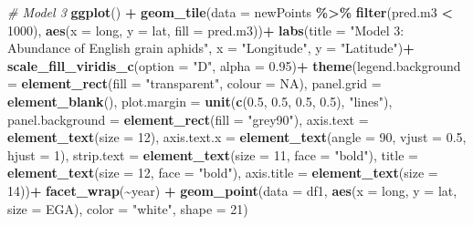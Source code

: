 \documentclass[
]{book}
\newenvironment{Shaded}{\begin{snugshade}}{\end{snugshade}}
\newcommand{\AttributeTok}[1]{\textcolor[rgb]{0.13,0.29,0.53}{#1}}
\newcommand{\CommentTok}[1]{\textcolor[rgb]{0.56,0.35,0.01}{\textit{#1}}}
\newcommand{\ConstantTok}[1]{\textcolor[rgb]{0.56,0.35,0.01}{#1}}
\newcommand{\DecValTok}[1]{\textcolor[rgb]{0.00,0.00,0.81}{#1}}
\newcommand{\FloatTok}[1]{\textcolor[rgb]{0.00,0.00,0.81}{#1}}
\newcommand{\FunctionTok}[1]{\textcolor[rgb]{0.13,0.29,0.53}{\textbf{#1}}}
\newcommand{\NormalTok}[1]{#1}
\newcommand{\SpecialCharTok}[1]{\textcolor[rgb]{0.81,0.36,0.00}{\textbf{#1}}}
\newcommand{\StringTok}[1]{\textcolor[rgb]{0.31,0.60,0.02}{#1}}
\begin{document}
\begin{Shaded}
\begin{Highlighting}[]
\CommentTok{\# Model 3}
\FunctionTok{ggplot}\NormalTok{() }\SpecialCharTok{+}
  \FunctionTok{geom\_tile}\NormalTok{(}\AttributeTok{data =}\NormalTok{ newPoints }\SpecialCharTok{\%\textgreater{}\%} \FunctionTok{filter}\NormalTok{(pred.m3 }\SpecialCharTok{\textless{}} \DecValTok{1000}\NormalTok{), }\FunctionTok{aes}\NormalTok{(}\AttributeTok{x =}\NormalTok{ long, }\AttributeTok{y =}\NormalTok{ lat, }\AttributeTok{fill =}\NormalTok{ pred.m3))}\SpecialCharTok{+}
  \FunctionTok{labs}\NormalTok{(}\AttributeTok{title =} \StringTok{"Model 3: Abundance of English grain aphids"}\NormalTok{, }\AttributeTok{x =} \StringTok{"Longitude"}\NormalTok{, }\AttributeTok{y =} \StringTok{"Latitude"}\NormalTok{)}\SpecialCharTok{+}
  \FunctionTok{scale\_fill\_viridis\_c}\NormalTok{(}\AttributeTok{option =} \StringTok{"D"}\NormalTok{, }\AttributeTok{alpha =} \FloatTok{0.95}\NormalTok{)}\SpecialCharTok{+}
  \FunctionTok{theme}\NormalTok{(}\AttributeTok{legend.background =} \FunctionTok{element\_rect}\NormalTok{(}\AttributeTok{fill =} \StringTok{"transparent"}\NormalTok{, }\AttributeTok{colour =} \ConstantTok{NA}\NormalTok{),}
        \AttributeTok{panel.grid =} \FunctionTok{element\_blank}\NormalTok{(),}
        \AttributeTok{plot.margin =} \FunctionTok{unit}\NormalTok{(}\FunctionTok{c}\NormalTok{(}\FloatTok{0.5}\NormalTok{, }\FloatTok{0.5}\NormalTok{, }\FloatTok{0.5}\NormalTok{, }\FloatTok{0.5}\NormalTok{), }\StringTok{"lines"}\NormalTok{),}
        \AttributeTok{panel.background =} \FunctionTok{element\_rect}\NormalTok{(}\AttributeTok{fill =} \StringTok{"grey90"}\NormalTok{),}
        \AttributeTok{axis.text =} \FunctionTok{element\_text}\NormalTok{(}\AttributeTok{size =} \DecValTok{12}\NormalTok{), }
        \AttributeTok{axis.text.x =} \FunctionTok{element\_text}\NormalTok{(}\AttributeTok{angle =} \DecValTok{90}\NormalTok{, }\AttributeTok{vjust =} \FloatTok{0.5}\NormalTok{, }\AttributeTok{hjust =} \DecValTok{1}\NormalTok{),}
        \AttributeTok{strip.text =} \FunctionTok{element\_text}\NormalTok{(}\AttributeTok{size =} \DecValTok{11}\NormalTok{, }\AttributeTok{face =} \StringTok{"bold"}\NormalTok{),}
        \AttributeTok{title =} \FunctionTok{element\_text}\NormalTok{(}\AttributeTok{size =} \DecValTok{12}\NormalTok{, }\AttributeTok{face =} \StringTok{"bold"}\NormalTok{),}
        \AttributeTok{axis.title =} \FunctionTok{element\_text}\NormalTok{(}\AttributeTok{size =} \DecValTok{14}\NormalTok{))}\SpecialCharTok{+}
  \FunctionTok{facet\_wrap}\NormalTok{(}\SpecialCharTok{\textasciitilde{}}\NormalTok{year) }\SpecialCharTok{+}
  \FunctionTok{geom\_point}\NormalTok{(}\AttributeTok{data =}\NormalTok{ df1, }\FunctionTok{aes}\NormalTok{(}\AttributeTok{x =}\NormalTok{ long, }\AttributeTok{y =}\NormalTok{ lat, }\AttributeTok{size =}\NormalTok{ EGA), }\AttributeTok{color =} \StringTok{"white"}\NormalTok{, }\AttributeTok{shape =} \DecValTok{21}\NormalTok{) }
\end{Highlighting}
\end{Shaded}
\end{document}
